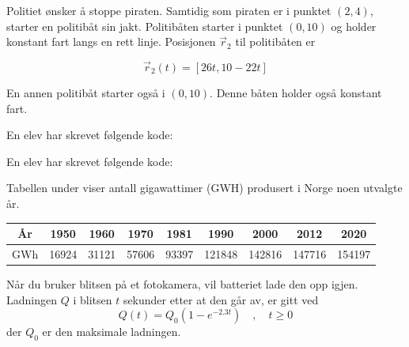 
Politiet ønsker å stoppe piraten. Samtidig som piraten er i
punktet $(2, 4)$, starter en politibåt sin jakt. Politibåten
starter i punktet $(0, 10)$ og holder konstant fart langs en
rett linje. Posisjonen $\vec{r}_2$ til politibåten er

\[
\vec{r}_2(t) = [26t, 10 - 22t]
\]


En annen politibåt starter også i $(0, 10)$. Denne båten
holder også konstant fart.


En elev har skrevet følgende kode:

En elev har skrevet følgende kode:

Tabellen under viser antall gigawattimer (GWH) produsert i Norge noen utvalgte år.
\begin{center}
	\small
	\begin{tabular}{|c|c|c|c|c|c|c|c|c|}
		\hline
		År & 1950 & 1960 & 1970 & 1981 & 1990 & 2000 & 2012 & 2020 \\
		\hline
		GWh & 16924 & 31121 & 57606 & 93397 & 121848 & 142816 & 147716 & 154197 \\
		\hline
	\end{tabular}
\end{center}

Når du bruker blitsen på et fotokamera, vil batteriet lade den opp igjen.
Ladningen $Q$ i blitsen $t$ sekunder etter at den går av, er gitt ved
\[
Q(t) = Q_0\left(1 - e^{-2.3t}\right)\quad, \quad t \geq 0
\]
der $Q_0$ er den maksimale ladningen.

